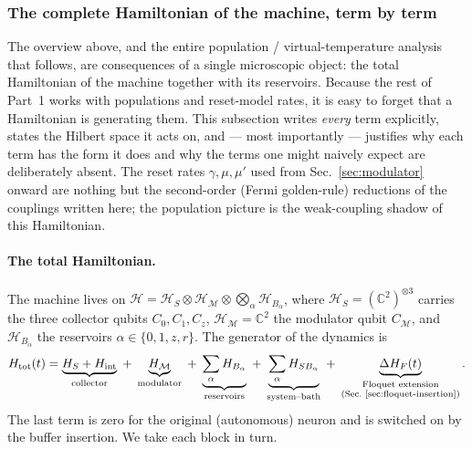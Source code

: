 \documentclass[11pt,a4paper]{article}
\theoremstyle{definition}
\theoremstyle{remark}
\newcommand{\calH}{\mathcal{H}}
\newcommand{\bbC}{\mathbb{C}}
\begin{document}
\subsubsection{The complete Hamiltonian of the machine, term by term}
\label{sec:full-hamiltonian}
The overview above, and the entire population / virtual-temperature
analysis that follows, are consequences of a single microscopic object:
the total Hamiltonian of the machine together with its reservoirs.
Because the rest of Part~1 works with populations and reset-model rates,
it is easy to forget that a Hamiltonian is generating them. This
subsection writes \emph{every} term explicitly, states the Hilbert space
it acts on, and --- most importantly --- justifies why each term has the
form it does and why the terms one might naively expect are deliberately
absent. The reset rates $\gamma,\mu,\mu'$ used from
Sec.~\ref{sec:modulator} onward are nothing but the second-order
(Fermi golden-rule) reductions of the couplings written here; the
population picture is the weak-coupling shadow of this Hamiltonian.

\paragraph{The total Hamiltonian.}
The machine lives on
$\calH = \calH_{S}\otimes\calH_{\mathcal{M}}
\otimes\bigotimes_\alpha \calH_{B_\alpha}$,
where $\calH_S=(\bbC^2)^{\otimes 3}$ carries the three collector qubits
$C_0,C_1,C_z$, $\calH_\mathcal{M}=\bbC^2$ the modulator qubit
$C_\mathcal{M}$, and $\calH_{B_\alpha}$ the reservoirs
$\alpha\in\{0,1,z,r\}$. The generator of the dynamics is
\begin{equation}
H_{\mathrm{tot}}(t)=
\underbrace{H_S+H_{\mathrm{int}}}_{\text{collector}}
\;+\;\underbrace{H_\mathcal{M}}_{\text{modulator}}
\;+\;\underbrace{\sum_\alpha H_{B_\alpha}}_{\text{reservoirs}}
\;+\;\underbrace{\sum_\alpha H_{SB_\alpha}}_{\text{system--bath}}
\;+\;\underbrace{\Delta H_{F}(t)}_{\substack{\text{Floquet extension}\\
(\text{Sec.~\ref{sec:floquet-insertion}})}} .
\label{eq:Htot-machine}
\end{equation}
The last term is zero for the original (autonomous) neuron and is
switched on by the buffer insertion. We take each block in turn.
\end{document}
